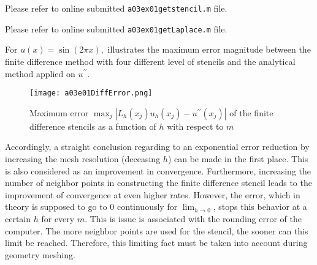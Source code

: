 %
 Please refer to online submitted \texttt{a03ex01getstencil.m} file.

%
 Please refer to online submitted \texttt{a03ex01getLaplace.m} file.

%
For $u(x) = \sin{(2\pi x)}, $\text{ } illustrates the maximum error magnitude between the finite difference method with four different level of stencils and the analytical method applied on $u^{\prime\prime}$.
\begin{figure}[H]
\vspace*{\FigUpperVSpace}
	\texttt{[image: a03e01DiffError.png]} 
	\caption{Maximum error $\max_j|L_h(x_j)u_h(x_j)-u^{\prime\prime}(x_j)|$ of the finite difference stencils as a function of $h$ with respect to $m$}
	\label{fig:a03e01DiffError}
\end{figure}
Accordingly, a straight conclusion regarding to an exponential error reduction by increasing the mesh resolution (deceasing $h$) can be made in the first place.
This is also considered as an improvement in convergence.
Furthermore, increasing the number of neighbor points in constructing the finite difference stencil leads to the improvement of convergence at even higher rates.
However, the error, which in theory is supposed to go to 0 continuously for $\lim_{h\rightarrow0}$, stops this behavior at a certain $h$ for every $m$.
This is issue is associated with the rounding error of the computer.
The more neighbor points are used for the stencil, the sooner can this limit be reached.
Therefore, this limiting fact must be taken into account during geometry meshing.